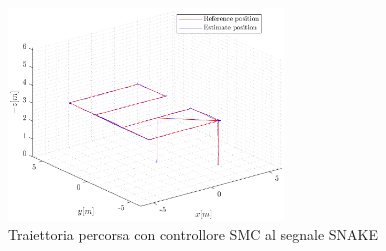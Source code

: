\begin{figure}
	\centering
	\includegraphics[width=0.65\textwidth]{Simulazioni/Figure/SMC/SNAKE/Trajectory}
	\caption{Traiettoria percorsa con controllore SMC al segnale SNAKE}
	\label{fig:SNAKEtraSMC}
\end{figure}

